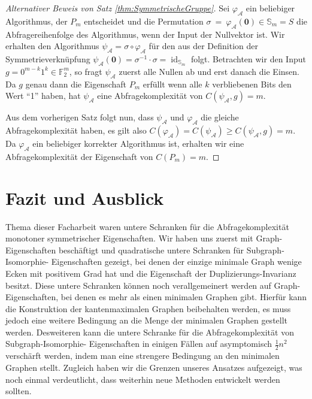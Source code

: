 \documentclass[10pt,a4paper, footheight=1mm]{scrreprt}
\theoremstyle{definition}
\begin{document}
\begin{proof}
[Alternativer Beweis von Satz \ref{thm:SymmetrischeGruppe}]
Sei $\varphi_\mathcal{A}$ ein beliebiger Algorithmus,
der $P_m$ entscheidet und die Permutation
$\sigma~=~\varphi_\mathcal{A}(\boldsymbol{0})\in\mathbb{S}_m=S$
die Abfragereihenfolge des Algorithmus, wenn der Input
der Nullvektor ist. Wir erhalten den Algorithmus
$\psi_\mathcal{A} = \sigma \circ \varphi_\mathcal{A}$
für den aus der Definition der Symmetrieverknüpfung
$\psi_\mathcal{A}(\boldsymbol{0})
= \sigma^{-1} \cdot \sigma = \operatorname{id}_{\mathbb{S}_m}$ folgt.
Betrachten wir den Input $g=0^{m-k}1^k \in \mathbb{F}_2^m$,
so fragt $\psi_\mathcal{A}$ zuerst alle Nullen ab und
erst danach die Einsen. Da $g$ genau dann die Eigenschaft
$P_m$ erfüllt wenn alle $k$ verbliebenen Bits den Wert
"`1"' haben, hat $\psi_\mathcal{A}$ eine Abfragekomplexität
von $C(\psi_\mathcal{A}, g) = m$.

Aus dem vorherigen Satz folgt nun, dass 
$\psi_\mathcal{A}$ und $\varphi_\mathcal{A}$ die gleiche
Abfragekomplexität haben, es gilt also
$C(\varphi_\mathcal{A}) = C(\psi_\mathcal{A}) 
\geq C(\psi_\mathcal{A},g) = m$.
Da $\varphi_\mathcal{A}$ ein beliebiger korrekter Algorithmus
ist, erhalten wir eine Abfragekomplexität der Eigenschaft
von $C(P_m)=m$.
\end{proof}


\begingroup
\let\clearpage\relax
\chapter{Fazit und Ausblick}
\endgroup
Thema dieser Facharbeit waren untere Schranken für die
Abfragekomplexität monotoner symmetrischer Eigenschaften.
Wir haben uns zuerst mit Graph-Eigenschaften beschäftigt 
und quadratische untere Schranken für Subgraph-Isomorphie-
Eigenschaften gezeigt, bei denen der einzige minimale
Graph wenige Ecken mit positivem Grad hat und die
Eigenschaft der Duplizierungs-Invarianz besitzt.
Diese untere Schranken können noch verallgemeinert werden
auf Graph-Eigenschaften, bei denen es mehr als einen
minimalen Graphen gibt. Hierfür kann die Konstruktion
der kantenmaximalen Graphen beibehalten werden, es muss
jedoch eine weitere Bedingung an die Menge der minimalen
Graphen gestellt werden. Desweiteren kann die untere
Schranke für die Abfragekomplexität von Subgraph-Isomorphie-
Eigenschaften in einigen Fällen auf asymptomisch $\frac{1}{2}n^2$
verschärft werden, indem man eine strengere Bedingung
an den minimalen Graphen stellt.
Zugleich haben wir die Grenzen unseres Ansatzes
aufgezeigt, was noch einmal verdeutlicht, dass 
weiterhin neue Methoden entwickelt werden sollten.
\end{document}
